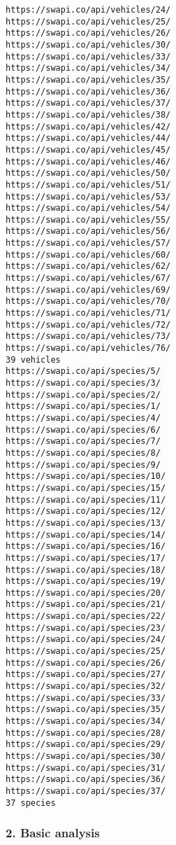 \documentclass[11pt]{article}
\begin{document}
\begin{Verbatim}[commandchars=\\\{\}]
https://swapi.co/api/vehicles/24/
https://swapi.co/api/vehicles/25/
https://swapi.co/api/vehicles/26/
https://swapi.co/api/vehicles/30/
https://swapi.co/api/vehicles/33/
https://swapi.co/api/vehicles/34/
https://swapi.co/api/vehicles/35/
https://swapi.co/api/vehicles/36/
https://swapi.co/api/vehicles/37/
https://swapi.co/api/vehicles/38/
https://swapi.co/api/vehicles/42/
https://swapi.co/api/vehicles/44/
https://swapi.co/api/vehicles/45/
https://swapi.co/api/vehicles/46/
https://swapi.co/api/vehicles/50/
https://swapi.co/api/vehicles/51/
https://swapi.co/api/vehicles/53/
https://swapi.co/api/vehicles/54/
https://swapi.co/api/vehicles/55/
https://swapi.co/api/vehicles/56/
https://swapi.co/api/vehicles/57/
https://swapi.co/api/vehicles/60/
https://swapi.co/api/vehicles/62/
https://swapi.co/api/vehicles/67/
https://swapi.co/api/vehicles/69/
https://swapi.co/api/vehicles/70/
https://swapi.co/api/vehicles/71/
https://swapi.co/api/vehicles/72/
https://swapi.co/api/vehicles/73/
https://swapi.co/api/vehicles/76/
39 vehicles
https://swapi.co/api/species/5/
https://swapi.co/api/species/3/
https://swapi.co/api/species/2/
https://swapi.co/api/species/1/
https://swapi.co/api/species/4/
https://swapi.co/api/species/6/
https://swapi.co/api/species/7/
https://swapi.co/api/species/8/
https://swapi.co/api/species/9/
https://swapi.co/api/species/10/
https://swapi.co/api/species/15/
https://swapi.co/api/species/11/
https://swapi.co/api/species/12/
https://swapi.co/api/species/13/
https://swapi.co/api/species/14/
https://swapi.co/api/species/16/
https://swapi.co/api/species/17/
https://swapi.co/api/species/18/
https://swapi.co/api/species/19/
https://swapi.co/api/species/20/
https://swapi.co/api/species/21/
https://swapi.co/api/species/22/
https://swapi.co/api/species/23/
https://swapi.co/api/species/24/
https://swapi.co/api/species/25/
https://swapi.co/api/species/26/
https://swapi.co/api/species/27/
https://swapi.co/api/species/32/
https://swapi.co/api/species/33/
https://swapi.co/api/species/35/
https://swapi.co/api/species/34/
https://swapi.co/api/species/28/
https://swapi.co/api/species/29/
https://swapi.co/api/species/30/
https://swapi.co/api/species/31/
https://swapi.co/api/species/36/
https://swapi.co/api/species/37/
37 species

    \end{Verbatim}

    \subsubsection{2. Basic analysis}\label{basic-analysis}
\end{document}
